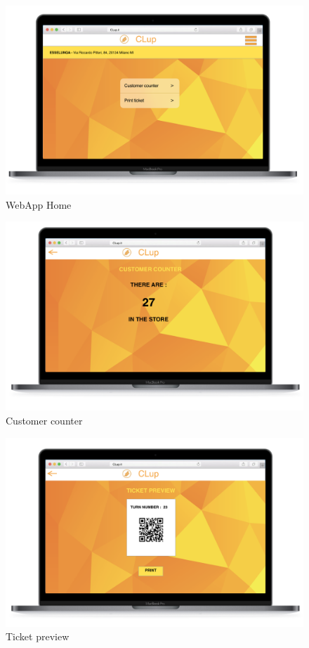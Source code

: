 \documentclass{article}
\begin{document}
\begin{figure}[H]
  \includegraphics[width=\linewidth]{WebAppHome.png}
  \centering
  \caption{WebApp Home} 
\end{figure}

\begin{figure}[H]
  \includegraphics[width=\linewidth]{CustomerCounter.png}
  \centering
  \caption{Customer counter} 
\end{figure}

\begin{figure}[H]
  \includegraphics[width=\linewidth]{TicketPreview.png}
  \centering
  \caption{Ticket preview} 
\end{figure}
\end{document}
